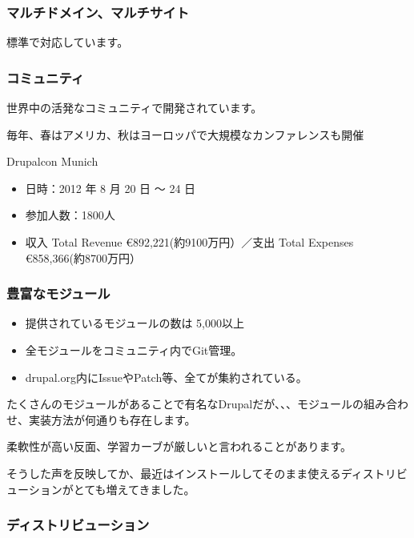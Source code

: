 \documentclass[mingoth,a4paper]{jsarticle}
\begin{document}
\subsubsection{マルチドメイン、マルチサイト}
標準で対応しています。

\subsubsection{コミュニティ}
世界中の活発なコミュニティで開発されています。

毎年、春はアメリカ、秋はヨーロッパで大規模なカンファレンスも開催

\begin{itembox}[l]{Drupalcon Munich}
  \begin{itemize}
  \item 日時：2012 年 8 月 20 日 〜 24 日
  \item 参加人数：1800人
  \item 収入 Total Revenue \euro 892,221(約9100万円）／支出 Total Expenses \euro 858,366(約8700万円）
  \end{itemize}
\end{itembox}

\subsubsection{豊富なモジュール}
\begin{itemize}
\item 提供されているモジュールの数は 5,000以上
\item 全モジュールをコミュニティ内でGit管理。
\item drupal.org内にIssueやPatch等、全てが集約されている。
\end{itemize}

たくさんのモジュールがあることで有名なDrupalだが、、、モジュールの組み合わせ、実装方法が何通りも存在します。

柔軟性が高い反面、学習カーブが厳しいと言われることがあります。

そうした声を反映してか、最近はインストールしてそのまま使えるディストリビューションがとても増えてきました。

\subsubsection{ディストリビューション}
\end{document}
